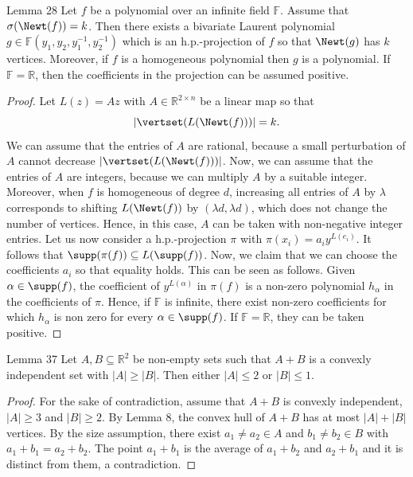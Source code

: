 \begin{sourceresult}{Lemma 28}
Let $f$ be a polynomial over an infinite field $\mathbb F$. Assume that $\sigma(\Newt(f))=k$. Then there exists a bivariate Laurent polynomial $g\in\mathbb F(y_1,y_2,y_1^{-1},y_2^{-1})$ which is an h.p.-projection of $f$ so that $\Newt(g)$ has $k$ vertices. Moreover, if $f$ is a homogeneous polynomial then $g$ is a polynomial. If $\mathbb F=\mathbb R$, then the coefficients in the projection can be assumed positive.
\end{sourceresult}
\begin{proof}
Let $L(z)=Az$ with $A\in\mathbb R^{2\times n}$ be a linear map so that
\[|\vertset(L(\Newt(f)))|=k.\]
We can assume that the entries of $A$ are rational, because a small perturbation of $A$ cannot decrease $|\vertset(L(\Newt(f)))|$. Now, we can assume that the entries of $A$ are integers, because we can multiply $A$ by a suitable integer.
Moreover, when $f$ is homogeneous of degree $d$, increasing all entries of $A$ by $\lambda$ corresponds to shifting $L(\Newt(f))$ by $(\lambda d,\lambda d)$, which does not change the number of vertices. Hence, in this case, $A$ can be taken with non-negative integer entries.
Let us now consider a h.p.-projection $\pi$ with $\pi(x_i)=a_i y^{L(e_i)}$. It follows that $\supp(\pi(f))\subseteq L(\supp(f))$. Now, we claim that we can choose the coefficients $a_i$ so that equality holds. This can be seen as follows. Given $\alpha\in\supp(f)$, the coefficient of $y^{L(\alpha)}$ in $\pi(f)$ is a non-zero polynomial $h_\alpha$ in the coefficients of $\pi$. Hence, if $\mathbb F$ is infinite, there exist non-zero coefficients for which $h_\alpha$ is non zero for every $\alpha\in\supp(f)$. If $\mathbb F=\mathbb R$, they can be taken positive.
\end{proof}

\begin{sourceresult}{Lemma 37}
Let $A,B\subseteq\mathbb R^2$ be non-empty sets such that $A+B$ is a convexly independent set with $|A|\ge|B|$. Then either $|A|\le2$ or $|B|\le1$.
\end{sourceresult}
\begin{proof}
For the sake of contradiction, assume that $A+B$ is convexly independent, $|A|\ge3$ and $|B|\ge2$. By Lemma 8, the convex hull of $A+B$ has at most $|A|+|B|$ vertices. By the size assumption, there exist $a_1\ne a_2\in A$ and $b_1\ne b_2\in B$ with $a_1+b_1=a_2+b_2$. The point $a_1+b_1$ is the average of $a_1+b_2$ and $a_2+b_1$ and it is distinct from them, a contradiction.
\end{proof}
